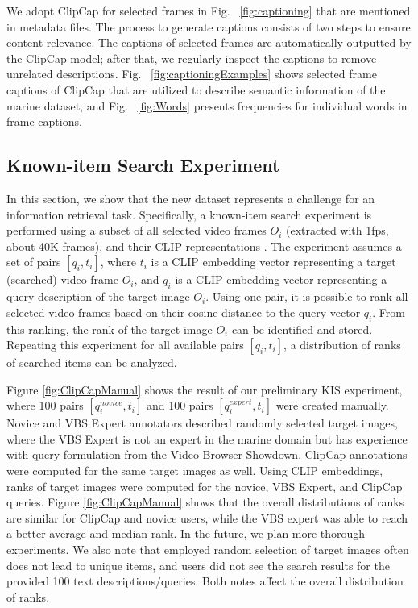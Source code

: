 \documentclass[runningheads]{llncs}
\begin{document}
We adopt ClipCap for selected frames in Fig. ~\ref{fig:captioning} that are mentioned in metadata files. The process to generate captions consists of two steps to ensure content relevance. The captions of selected frames are automatically outputted by the ClipCap model; after that, we regularly inspect the captions to remove unrelated descriptions. Fig.  ~\ref{fig:captioningExamples} shows selected frame captions of ClipCap that are utilized to describe semantic information of the marine dataset, and Fig. ~\ref{fig:Words} presents frequencies for individual words in frame captions.


\subsection{Known-item Search Experiment}
In this section, we show that the new dataset represents a challenge for an information retrieval task. Specifically, a known-item search experiment is performed using a subset of all selected video frames $O_i$ (extracted with 1fps, about 40K frames), and their CLIP representations \cite{CLIP}. The experiment assumes a set of pairs $[q_i, t_i]$, where $t_i$ is a CLIP embedding vector representing a target (searched) video frame $O_i$, and $q_i$ is a CLIP embedding vector representing a query description of the target image $O_i$.
Using one pair, it is possible to rank all selected video frames based on their cosine distance to the query vector $q_i$. From this ranking, the rank of the target image $O_i$ can be identified and stored. Repeating this experiment for all available pairs $[q_i, t_i]$, a distribution of ranks of searched items can be analyzed.

Figure  \ref{fig:ClipCapManual} shows the result of our preliminary KIS experiment, where 100 pairs $[q_i^{novice}, t_i]$ and 100 pairs $[q_i^{expert}, t_i]$ were created manually. Novice and VBS Expert annotators described randomly selected target images, where the VBS Expert is not an expert in the marine domain but has experience with query formulation from the Video Browser Showdown. ClipCap annotations were computed for the same target images as well. Using CLIP embeddings, ranks of target images were computed for the novice, VBS Expert, and ClipCap queries. Figure \ref{fig:ClipCapManual} shows that the overall distributions of ranks are similar for ClipCap and novice users, while the VBS expert was able to reach a better average and median rank. In the future, we plan more thorough experiments.
We also note that employed random selection of target images often does not lead to unique items, and users did not see the search results for the provided 100 text descriptions/queries. Both notes affect the overall distribution of ranks.
\end{document}
